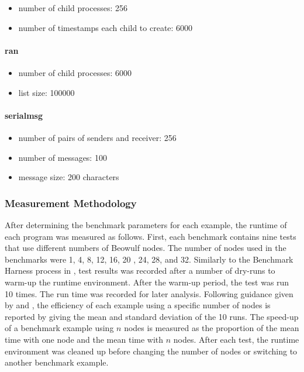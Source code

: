 \begin{itemize}
  \item number of child processes: 256
  \item number of timestamps each child to create: 6000
\end{itemize}



\paragraph{ran} 
\begin{itemize}
  \item number of child processes: 6000
  \item list size: 100000
\end{itemize}


\paragraph{serialmsg}

\begin{itemize}
  \item number of pairs of senders and receiver: 256
  \item number of messages: 100
  \item message size: 200 characters
\end{itemize}

\subsubsection{Measurement Methodology}

After determining the benchmark parameters for each example, the runtime of 
each program was measured as follows.  First, each benchmark contains nine 
tests that use different numbers of Beowulf nodes.  The number of nodes 
used in the benchmarks were 1, 4, 8, 12, 16, 20 , 24, 28, and 32.  Similarly 
to the Benchmark Harness process in \citep{blackburn2006dacapo}, test results 
was recorded after a number of dry-runs to warm-up the runtime environment.  
After the warm-up period, the test was run 10 times.  The 
run time was recorded for later analysis.  Following guidance given by 
\citet{Fleming} and \citet{HePa06}, the efficiency of each example 
using a specific number of nodes is reported by giving the mean and standard 
deviation of the 10 runs.  The speed-up of a benchmark example using $n$ nodes 
is measured as the proportion of the mean time with one node and the mean 
time with $n$ nodes.  After each test, the runtime environment was cleaned up  
before changing the number of nodes or switching to another benchmark example.

